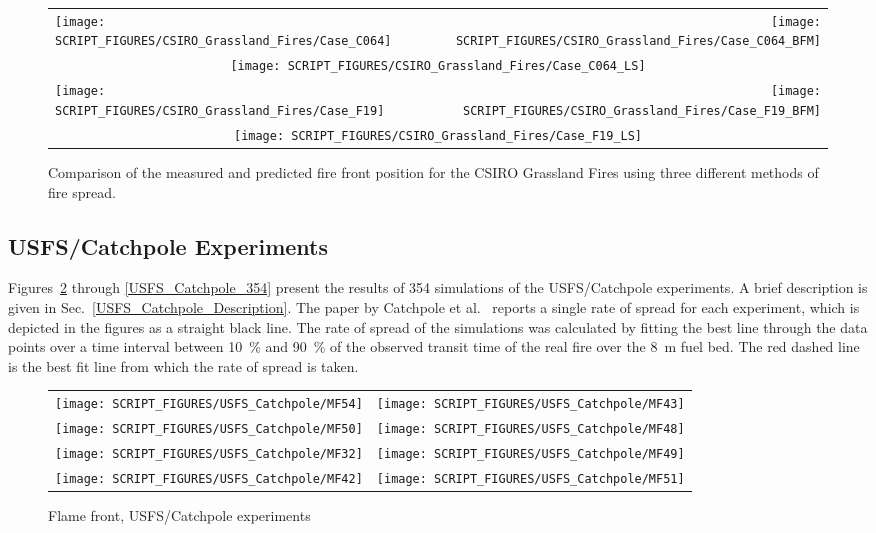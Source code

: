 \begin{figure}[p]
\begin{tabular*}{\textwidth}{l@{\extracolsep{\fill}}r}
\texttt{[image: SCRIPT\_FIGURES/CSIRO\_Grassland\_Fires/Case\_C064]} & \texttt{[image: SCRIPT\_FIGURES/CSIRO\_Grassland\_Fires/Case\_C064\_BFM]} \\
\multicolumn{2}{c}{\texttt{[image: SCRIPT\_FIGURES/CSIRO\_Grassland\_Fires/Case\_C064\_LS]} } \\
\texttt{[image: SCRIPT\_FIGURES/CSIRO\_Grassland\_Fires/Case\_F19]}  & \texttt{[image: SCRIPT\_FIGURES/CSIRO\_Grassland\_Fires/Case\_F19\_BFM]} \\
\multicolumn{2}{c}{\texttt{[image: SCRIPT\_FIGURES/CSIRO\_Grassland\_Fires/Case\_F19\_LS]} }
\end{tabular*}
\caption[Measured and predicted fire front position for the CSIRO Grassland Fires]{Comparison of the measured and predicted fire front position for the CSIRO Grassland Fires using three different methods of fire spread.}
\label{CSIRO}
\end{figure}


\clearpage


\subsection{USFS/Catchpole Experiments}
\label{USFS_Catchpole_Plots}

Figures~\ref{USFS_Catchpole_008} through \ref{USFS_Catchpole_354} present the results of 354 simulations of the USFS/Catchpole experiments. A brief description is given in Sec.~\ref{USFS_Catchpole_Description}. The paper by Catchpole et al.~\cite{Catchpole:CST1998} reports a single rate of spread for each experiment, which is depicted in the figures as a straight black line. The rate of spread of the simulations was calculated by fitting the best line through the data points over a time interval between 10~\% and 90~\% of the observed transit time of the real fire over the 8~m fuel bed. The red dashed line is the best fit line from which the rate of spread is taken.

\newpage

\begin{figure}[p]
\begin{tabular*}{\textwidth}{l@{\extracolsep{\fill}}r}
\texttt{[image: SCRIPT\_FIGURES/USFS\_Catchpole/MF54]} &
\texttt{[image: SCRIPT\_FIGURES/USFS\_Catchpole/MF43]} \\
\texttt{[image: SCRIPT\_FIGURES/USFS\_Catchpole/MF50]} &
\texttt{[image: SCRIPT\_FIGURES/USFS\_Catchpole/MF48]} \\
\texttt{[image: SCRIPT\_FIGURES/USFS\_Catchpole/MF32]} &
\texttt{[image: SCRIPT\_FIGURES/USFS\_Catchpole/MF49]} \\
\texttt{[image: SCRIPT\_FIGURES/USFS\_Catchpole/MF42]} &
\texttt{[image: SCRIPT\_FIGURES/USFS\_Catchpole/MF51]} \\
\end{tabular*}
\caption[Flame front, USFS/Catchpole experiments]{Flame front, USFS/Catchpole experiments}
\label{USFS_Catchpole_008}
\end{figure}

